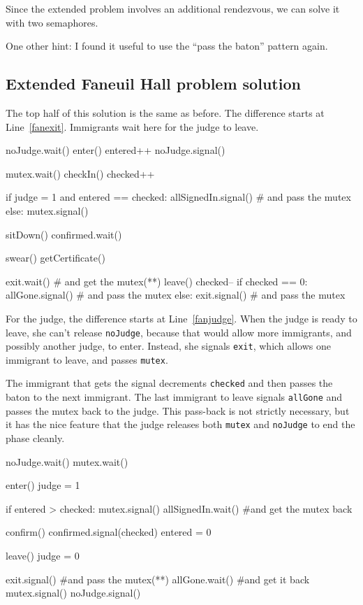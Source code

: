 \documentclass{book}
\begin{document}
Since the extended problem involves an additional rendezvous,
we can solve it with two semaphores.

One other hint: I found it useful to use the ``pass the baton''
pattern again.



\subsection {Extended Faneuil Hall problem solution}

The top half of this solution is the same as before.  The
difference starts at Line~\ref{fanexit}.  Immigrants wait
here for the judge to leave.


\begin{unbreakable}[title={Faneuil Hall problem solution (immigrant)}]{}
noJudge.wait()
enter()
entered++
noJudge.signal()

mutex.wait()
checkIn()
checked++

if judge = 1 and entered == checked:
 allSignedIn.signal() # and pass the mutex
else:
 mutex.signal()

sitDown()
confirmed.wait()

swear()
getCertificate()

exit.wait() # and get the mutex(*\label{fanexit}*)
leave()
checked--
if checked == 0:
 allGone.signal() # and pass the mutex
else:
 exit.signal() # and pass the mutex
\end{unbreakable}

For the judge, the difference starts at Line~\ref{fanjudge}.
When the judge is ready to leave, she can't release {\tt noJudge},
because that would allow more immigrants, and possibly another
judge, to enter.  Instead, she signals {\tt exit}, which allows
one immigrant to leave, and passes {\tt mutex}.

The immigrant that gets the signal decrements {\tt checked} and
then passes the baton to the next immigrant.  The last immigrant
to leave signals {\tt allGone} and passes the mutex back to the
judge.  This pass-back is not strictly necessary, but it has
the nice feature that the judge releases both {\tt mutex}
and {\tt noJudge} to end the phase cleanly.


\begin{unbreakable}[title={Faneuil Hall problem solution (judge)}]{}
noJudge.wait()
mutex.wait()

enter()
judge = 1

if entered > checked:
 mutex.signal()
 allSignedIn.wait() #and get the mutex back

confirm()
confirmed.signal(checked)
entered = 0

leave()
judge = 0

exit.signal()  #and pass the mutex(*\label{fanjudge}*)
allGone.wait() #and get it back
mutex.signal()
noJudge.signal()
\end{unbreakable}
\end{document}
